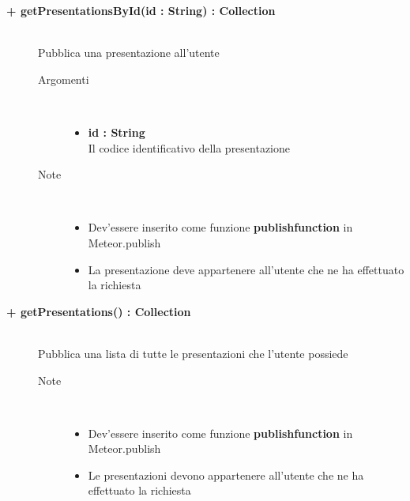 \begin{description}
	\begin{description}
		\item[\textbf{\color{blue}+ getPresentationsById(id : String) : Collection			}] \hfill \\
			Pubblica una presentazione all'utente
			
		\begin{description}
			\item[Argomenti] \hfill \\
				\begin{itemize}
				
					\item \textbf{id : String			} \hfill \\
					Il codice identificativo della presentazione
					
				\end{itemize}
			\item[Note] \hfill \\
			\begin{itemize}
					\item Dev'essere inserito come funzione \textbf{publishfunction} in Meteor.publish
					\item La presentazione deve appartenere all'utente che ne ha effettuato la richiesta
				\end{itemize}
		\end{description}
	\end{description}
	
	\begin{description}
		\item[\textbf{\color{blue}+ getPresentations() : Collection			}] \hfill \\
			Pubblica una lista di tutte le presentazioni che l'utente possiede
			
		\begin{description}
			
			\item[Note] \hfill \\
			\begin{itemize}
					\item Dev'essere inserito come funzione \textbf{publishfunction} in Meteor.publish
					\item Le presentazioni devono appartenere all'utente che ne ha effettuato la richiesta
				\end{itemize}
		\end{description}
	\end{description}
	

\end{description}
